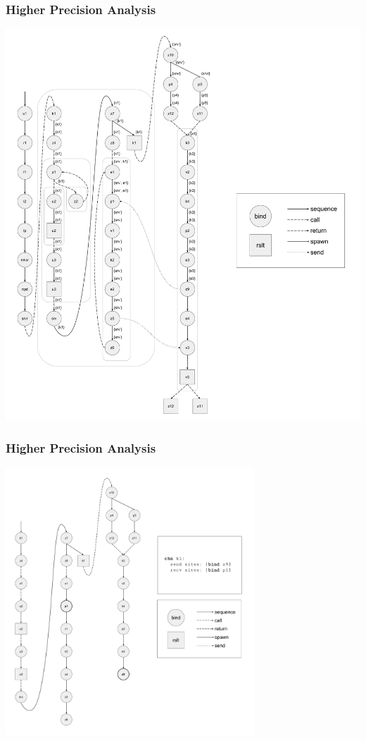 \documentclass{beamer}
\begin{document}
\begin{frame}
\frametitle{Higher Precision Analysis}
\includegraphics[width=.7\textwidth]{cml-liveness-analysis-k1.pdf}
\end{frame}

\begin{frame}
\frametitle{Higher Precision Analysis}
\includegraphics[width=0.7\textwidth]{cml-graph-k1.pdf}
\end{frame}
\end{document}
